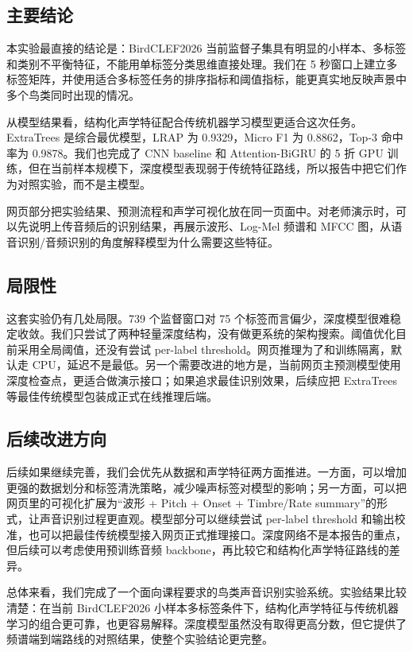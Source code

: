 \documentclass[12pt,a4paper]{article}
\begin{document}
\subsection{主要结论}
本实验最直接的结论是：BirdCLEF2026 当前监督子集具有明显的小样本、多标签和类别不平衡特征，不能用单标签分类思维直接处理。我们在 5 秒窗口上建立多标签矩阵，并使用适合多标签任务的排序指标和阈值指标，能更真实地反映声景中多个鸟类同时出现的情况。

从模型结果看，结构化声学特征配合传统机器学习模型更适合这次任务。ExtraTrees 是综合最优模型，LRAP 为 0.9329，Micro F1 为 0.8862，Top-3 命中率为 0.9878。我们也完成了 CNN baseline 和 Attention-BiGRU 的 5 折 GPU 训练，但在当前样本规模下，深度模型表现弱于传统特征路线，所以报告中把它们作为对照实验，而不是主模型。

网页部分把实验结果、预测流程和声学可视化放在同一页面中。对老师演示时，可以先说明上传音频后的识别结果，再展示波形、Log-Mel 频谱和 MFCC 图，从语音识别/音频识别的角度解释模型为什么需要这些特征。

\subsection{局限性}
这套实验仍有几处局限。739 个监督窗口对 75 个标签而言偏少，深度模型很难稳定收敛。我们只尝试了两种轻量深度结构，没有做更系统的架构搜索。阈值优化目前采用全局阈值，还没有尝试 per-label threshold。网页推理为了和训练隔离，默认走 CPU，延迟不是最低。另一个需要改进的地方是，当前网页主预测模型使用深度检查点，更适合做演示接口；如果追求最佳识别效果，后续应把 ExtraTrees 等最佳传统模型包装成正式在线推理后端。

\subsection{后续改进方向}
后续如果继续完善，我们会优先从数据和声学特征两方面推进。一方面，可以增加更强的数据划分和标签清洗策略，减少噪声标签对模型的影响；另一方面，可以把网页里的可视化扩展为“波形 + Pitch + Onset + Timbre/Rate summary”的形式，让声音识别过程更直观。模型部分可以继续尝试 per-label threshold 和输出校准，也可以把最佳传统模型接入网页正式推理接口。深度网络不是本报告的重点，但后续可以考虑使用预训练音频 backbone，再比较它和结构化声学特征路线的差异。

总体来看，我们完成了一个面向课程要求的鸟类声音识别实验系统。实验结果比较清楚：在当前 BirdCLEF2026 小样本多标签条件下，结构化声学特征与传统机器学习的组合更可靠，也更容易解释。深度模型虽然没有取得更高分数，但它提供了频谱端到端路线的对照结果，使整个实验结论更完整。
\end{document}
